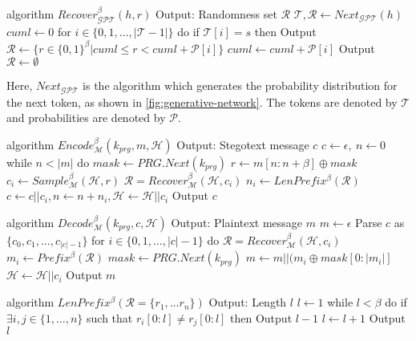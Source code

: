 \documentclass[english,version-2020-11]{uzl-thesis}
\begin{document}
\begin{Pseudocode}
algorithm $Recover_{\mathcal{GPT}}^\beta(h, r)$
	Output: Randomness set $\mathcal{R}$
	$\mathcal{T}, \mathcal{R} \leftarrow Next_{\mathcal{GPT}}(h)$
	$cuml \leftarrow 0$
	for $i \in \{ 0, 1, \dots, | \mathcal{T} - 1 | \}$ do
		if $\mathcal{T}[i] = s$ then
			Output $\mathcal{R} \leftarrow \{ r \in \{ 0, 1\}^\beta | cuml \leq r < cuml + \mathcal{P}[i] \}$
		$cuml \leftarrow cuml + \mathcal{P}[i]$
	Output $\mathcal{R} \leftarrow \emptyset$
\end{Pseudocode}

Here, $Next_{\mathcal{GPT}}$ is the algorithm which generates the probability distribution for the next token, as shown in \autoref{fig:generative-network}.
The tokens are denoted by $\mathcal{T}$ and probabilities are denoted by $\mathcal{P}$.



\begin{Pseudocode}
algorithm $Encode_{\mathcal{M}}^\beta(k_{prg}, m, \mathcal{H})$
	Output: Stegotext message $c$
	$c \leftarrow \epsilon,~ n \leftarrow 0$
	while $n < |m|$ do
		$mask \leftarrow PRG.Next(k_{prg})$
		$r \leftarrow m[n:n+\beta] \oplus mask$
		$c_i \leftarrow Sample_{\mathcal{M}}^\beta(\mathcal{H}, r)$
		$\mathcal{R} = Recover_{\mathcal{M}}^\beta(\mathcal{H}, c_i)$
		$n_i \leftarrow LenPrefix^\beta(\mathcal{R})$
		$c \leftarrow c || c_i, n \leftarrow n+n_i, \mathcal{H} \leftarrow \mathcal{H}||c_i$
	Output $c$
\end{Pseudocode}


\begin{Pseudocode}
algorithm $Decode_{\mathcal{M}}^\beta(k_{prg}, c, \mathcal{H})$
	Output: Plaintext message $m$
	$m \leftarrow \epsilon$
	Parse $c$ as $\{ c_0, c_1, \dots, c_{|c|-1} \}$
	for $i \in \{0, 1, \dots, |c|-1 \}$ do
		$\mathcal{R} = Recover_{\mathcal{M}}^\beta(\mathcal{H}, c_i)$
		$m_i \leftarrow Prefix^\beta(\mathcal{R})$
		$mask \leftarrow PRG.Next(k_{prg})$
		$m \leftarrow m || (m_i \oplus mask[0: |m_i|]$
		$\mathcal{H} \leftarrow \mathcal{H}||c_i$
	Output $m$
\end{Pseudocode}

\begin{Pseudocode}
algorithm $LenPrefix^\beta(\mathcal R = \{ r_1, \dots r_n \})$
	Output: Length $l$
	$l \leftarrow 1$
	while $l < \beta$ do
		if $\exists i, j \in \{ 1, \dots, n \}$ such that $r_i[0: l] \neq r_j[0:	l]$ then
			Output $l-1$
		$l \leftarrow l+1$
	Output $l$
\end{Pseudocode}
\end{document}
